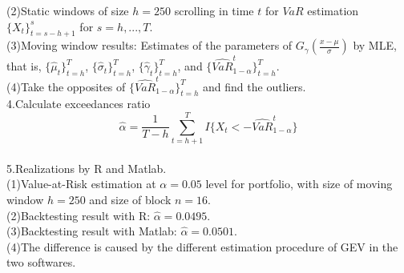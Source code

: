 \documentclass[a4paper,11pt]{article}
\begin{document}
\begin{flushleft}
  (2)Static windows of size $h=250$ scrolling in time $t$ for $VaR$ estimation $\{X_t\}_{t=s-h+1}^{s}$ for $s=h,...,T$.\\
  
  (3)Moving window results: Estimates of the parameters of $G_{\gamma}(\frac{x-\mu}{\sigma})$ by MLE, that is, $\{\hat{\mu}_t\}_{t=h}^T$, $\{\hat{\sigma}_t\}_{t=h}^T$, $\{\hat{\gamma}_t\}_{t=h}^T$, and $\{\widehat{VaR}_{1-\alpha}^t\}_{t=h}^T$.\\
  
  (4)Take the opposites of $\{\widehat{VaR}_{1-\alpha}^t\}_{t=h}^T$ and find the outliers.\\
  
4.Calculate exceedances ratio\\
$$\hat{\alpha}=\frac{1}{T-h}\sum_{t=h+1}^{T}I\{X_t<-\widehat{VaR}_{1-\alpha}^{t}\}$$\\

5.Realizations by R and Matlab.\\

  (1)Value-at-Risk estimation at $\alpha = 0.05$ level for portfolio, with size of moving window $h=250$ and size of block $n = 16$.\\

  (2)Backtesting result with R: $\hat{\alpha}= 0.0495$.\\

  (3)Backtesting result with Matlab: $\hat{\alpha}= 0.0501$.\\

  (4)The difference is caused by the different estimation procedure of GEV in the two softwares.\\


\end{flushleft}
\end{document}
